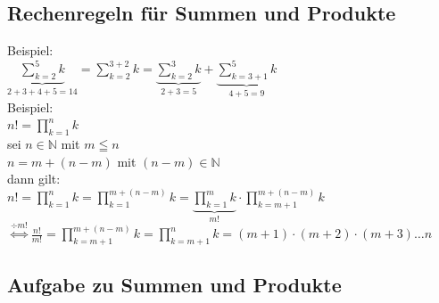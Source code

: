 \subsection{Rechenregeln für Summen und Produkte}

\begin{center}
\end{center}
Beispiel:\\

$\underbrace{\sum\limits_{k=2}^{5}k}_{2+3+4+5=14}=\sum\limits_{k=2}^{3+2}k=\underbrace{\sum\limits_{k=2}^{3}k}_{2+3=5}+\underbrace{\sum\limits_{k=3+1}^{5}k}_{4+5=9}$\\
Beispiel:\\
$n!=\prod\limits_{k=1}^{n}k$\\
sei $n\in \mathbb{N}$ mit $m\leqq n$ \\
$n=m+(n-m)$ mit $(n-m)\in \mathbb{N}$\\
dann gilt:\\
$n!=\prod\limits_{k=1}^{n}k=\prod\limits_{k=1}^{\scriptscriptstyle m+(n-m)}k=\underbrace{\prod\limits_{k=1}^{m}k}_{m!}\cdot\prod\limits_{\scriptscriptstyle k=m+1}^{\scriptscriptstyle m+(n-m)}k$\\
$\overset{\div m!}{\Leftrightarrow}\frac{n!}{m!}=\prod\limits_{\scriptscriptstyle k=m+1}^{\scriptscriptstyle m+(n-m)}k=\prod\limits_{\scriptscriptstyle k=m+1}^{n}k=(m+1)\cdot (m+2)\cdot (m+3)\ldots n$\vspace*{2mm}\\
\begin{center}
\end{center}
\subsection{Aufgabe zu Summen und Produkte}

